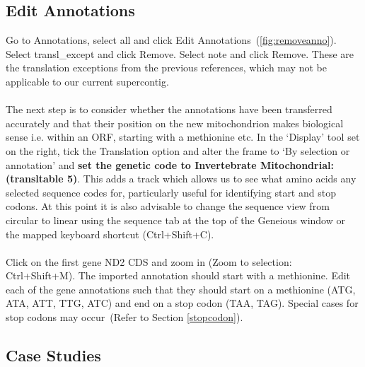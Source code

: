 \documentclass[11pt]{article}
\newcommand{\secref}[1]{(Refer to Section \ref{#1})}
\begin{document}
\subsection{Edit Annotations}
Go to Annotations, select all and click Edit Annotations~(\autoref{fig:removeanno}). Select transl\_except and click Remove. Select note and click Remove. These are the translation exceptions from the previous references, which may not be applicable to our current supercontig.
\\
\\
The next step is to consider whether the annotations have been transferred accurately and that their position on the new mitochondrion makes biological sense i.e. within an ORF, starting with a methionine etc. In the `Display' tool set on the right, tick the Translation option and alter the frame to `By selection or annotation' and \textbf{set the genetic code to Invertebrate Mitochondrial: (transl\textunderscore table 5)}. This adds a track which allows us to see what amino acids any selected sequence codes for, particularly useful for identifying start and stop codons. At this point it is also advisable to change the sequence view from circular to linear using the sequence tab at the top of the Geneious window or the mapped keyboard shortcut (Ctrl+Shift+C). 
\\
\\
Click on the first gene ND2 CDS and zoom in (Zoom to selection: Ctrl+Shift+M). The imported annotation should start with a methionine. Edit each of the gene annotations such that they should start on a methionine (ATG, ATA, ATT, TTG, ATC) and end on a stop codon (TAA, TAG). Special cases for stop codons may occur~\secref{stopcodon}.

\subsection{Case Studies}
\end{document}
